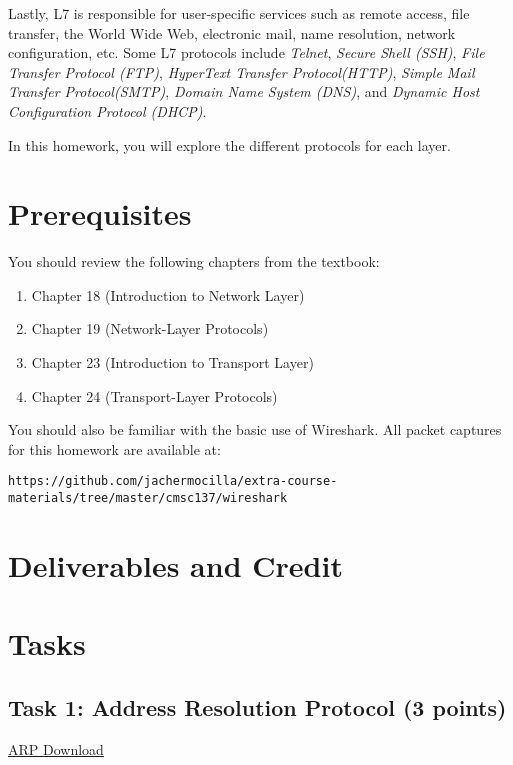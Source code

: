 \documentclass[a4paper, 11pt,oneside]{article}
\begin{document}
Lastly, L7 is responsible for user-specific services such as remote access, file transfer, the World Wide Web, electronic mail, name resolution, network configuration, etc. Some L7 protocols include \textit{Telnet}, \textit{Secure Shell (SSH)}, \textit{File Transfer Protocol (FTP)}, \textit{HyperText Transfer Protocol(HTTP)}, \textit{Simple Mail Transfer Protocol(SMTP)}, \textit{Domain Name System (DNS)}, and \textit{Dynamic Host Configuration Protocol (DHCP)}.   

In this homework, you will explore the different protocols for each layer.  

\section{Prerequisites}
You should review the following chapters from the textbook:
\begin{enumerate}
	\item{Chapter 18 (Introduction to Network Layer)} 
	\item{Chapter 19 (Network-Layer Protocols)} 
	\item{Chapter 23 (Introduction to Transport Layer)} 
	\item{Chapter 24 (Transport-Layer Protocols)} 
\end{enumerate}
You should also be familiar with the basic use of Wireshark. All packet captures for this homework are available at:
\begin{verbatim}
https://github.com/jachermocilla/extra-course-materials/tree/master/cmsc137/wireshark
\end{verbatim}


\section{Deliverables and Credit}


\section{Tasks}

\subsection*{Task 1: Address Resolution Protocol (3 points)} 

\href{https://github.com/jachermocilla/extra-course-materials/raw/master/cmsc137/wireshark/arp.pcapng}{ARP Download}

\noindent{}
\end{document}
